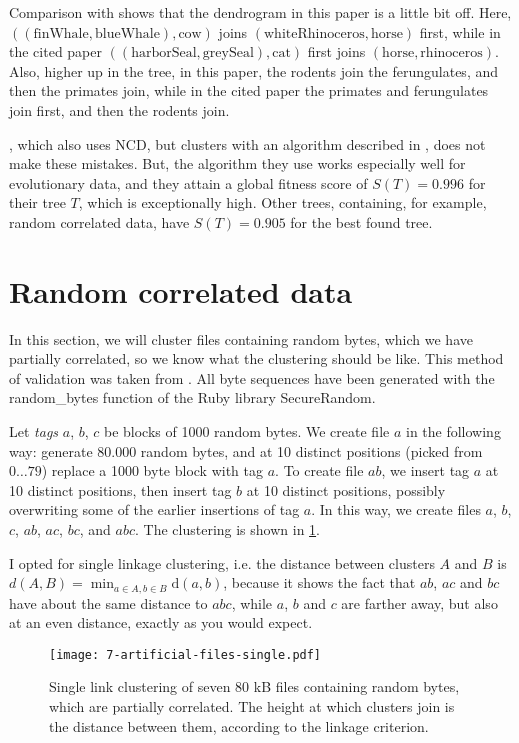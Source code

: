 Comparison with \cite{Cao1998} shows that the dendrogram in this paper is a little bit off. Here, $((\text{finWhale}, \text{blueWhale}), \text{cow})$ joins $(\text{whiteRhinoceros}, \text{horse})$ first, while in the cited paper $((\text{harborSeal}, \text{greySeal}), \text{cat})$ first joins $(\text{horse}, \text{rhinoceros})$. Also, higher up in the tree, in this paper, the rodents join the ferungulates, and then the primates join, while in the cited paper the primates and ferungulates join first, and then the rodents join.

\cite{Cilibrasi2005}, which also uses NCD, but clusters with an algorithm described in \cite{Cilibrasi2011}, does not make these mistakes. But, the algorithm they use works especially well for evolutionary data, and they attain a global fitness score of $S(T) = 0.996$ for their tree $T$, which is exceptionally high. Other trees, containing, for example, random correlated data, have $S(T) = 0.905$ for the best found tree.

\section{Random correlated data}

In this section, we will cluster files containing random bytes, which we have partially correlated, so we know what the clustering should be like. This method of validation was taken from \cite{Cilibrasi2005}. All byte sequences have been generated with the random\_bytes function of the Ruby library SecureRandom.

Let \emph{tags} $a$, $b$, $c$ be blocks of 1000 random bytes. We create file $a$ in the following way: generate 80.000 random bytes, and at 10 distinct positions (picked from $0 \dots 79$) replace a 1000 byte block with tag $a$. To create file $ab$, we insert tag $a$ at 10 distinct positions, then insert tag $b$ at 10 distinct positions, possibly overwriting some of the earlier insertions of tag $a$. In this way, we create files $a$, $b$, $c$, $ab$, $ac$, $bc$, and $abc$. The clustering is shown in \ref{figure:7_artificial_files}.

I opted for single linkage clustering, i.e. the distance between clusters $A$ and $B$ is $d(A, B) = \min_{a \in A, b \in B} \text{d}(a, b)$, because it shows the fact that $ab$, $ac$ and $bc$ have about the same distance to $abc$, while $a$, $b$ and $c$ are farther away, but also at an even distance, exactly as you would expect.

\begin{figure}[h!]
  \texttt{[image: 7-artificial-files-single.pdf]}
  \caption{Single link clustering of seven 80 kB files containing random bytes, which are partially correlated. The height at which clusters join is the distance between them, according to the linkage criterion.}
  \label{figure:7_artificial_files}
\end{figure}

